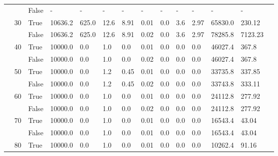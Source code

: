 \documentclass{article}
\begin{document}
\begin{landscape}
\begin{small}
\begin{longtable}[c]{@{}lll|ll|ll|ll|ll|lll@{}}
   &    & False & -               & -              & -             & -             & -             & -             & -             & -             & -             & -           &  \\
   & 30 & True  & 10636.2         & 625.0          & 12.6          & 8.91          & 0.01          & 0.0           & 3.6           & 2.97          & 65830.0       & 230.12      &  \\
   &    & False & 10636.2         & 625.0          & 12.6          & 8.91          & 0.02          & 0.0           & 3.6           & 2.97          & 78285.8       & 7123.23     &  \\
   & 40 & True  & 10000.0         & 0.0            & 1.0           & 0.0           & 0.01          & 0.0           & 0.0           & 0.0           & 46027.4       & 367.8       &  \\
   &    & False & 10000.0         & 0.0            & 1.0           & 0.0           & 0.02          & 0.0           & 0.0           & 0.0           & 46027.4       & 367.8       &  \\
   & 50 & True  & 10000.0         & 0.0            & 1.2           & 0.45          & 0.01          & 0.0           & 0.0           & 0.0           & 33735.8       & 337.85      &  \\
   &    & False & 10000.0         & 0.0            & 1.2           & 0.45          & 0.02          & 0.0           & 0.0           & 0.0           & 33743.8       & 333.11      &  \\
   & 60 & True  & 10000.0         & 0.0            & 1.0           & 0.0           & 0.01          & 0.0           & 0.0           & 0.0           & 24112.8       & 277.92      &  \\
   &    & False & 10000.0         & 0.0            & 1.0           & 0.0           & 0.02          & 0.0           & 0.0           & 0.0           & 24112.8       & 277.92      &  \\
   & 70 & True  & 10000.0         & 0.0            & 1.0           & 0.0           & 0.01          & 0.0           & 0.0           & 0.0           & 16543.4       & 43.04       &  \\
   &    & False & 10000.0         & 0.0            & 1.0           & 0.0           & 0.01          & 0.0           & 0.0           & 0.0           & 16543.4       & 43.04       &  \\
   & 80 & True  & 10000.0         & 0.0            & 1.0           & 0.0           & 0.01          & 0.0           & 0.0           & 0.0           & 10262.4       & 91.16       &  \\

\end{longtable}
\end{small}
\end{landscape}
\end{document}
